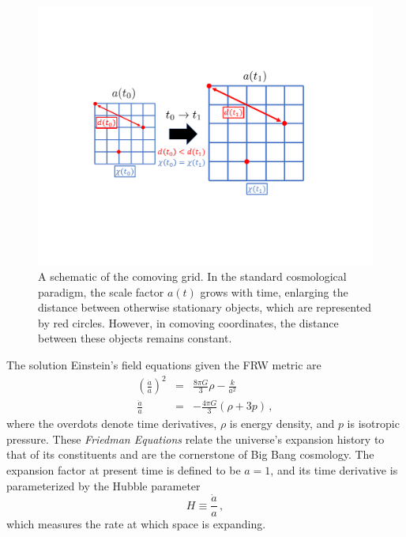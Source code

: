 \begin{figure}[!t]
    \centering
    \includegraphics[width=0.9\linewidth, trim=3cm 5.5cm 3cm 5cm, clip]{ScientificMotivation/Figures/comoving_grid.pdf}
    \caption[A schematic of the comoving grid]{A schematic of the comoving grid. In the standard cosmological paradigm, the scale factor $a(t)$ grows with time, enlarging the distance between otherwise stationary objects, which are represented by red circles. However, in comoving coordinates, the distance between these objects remains constant.}
    \label{fig:comoving_grid}
\end{figure}

The solution Einstein's field equations given the FRW metric are
\begin{eqnarray}
    \left( \frac{\dot a}{a} \right)^{2} & = & \frac{8 \pi G}{3} \rho - \frac{k}{a^{2}} \\
    \frac{\ddot a}{a} & = & - \frac{4 \pi G}{3} \left( \rho + 3p \right) \, ,
    \label{eq:friedmann_equations}
\end{eqnarray}
where the overdots denote time derivatives, $\rho$ is energy density, and $p$ is isotropic pressure. These \textit{Friedman Equations} relate the universe's expansion history to that of its constituents and are the cornerstone of Big Bang cosmology. The expansion factor at present time is defined to be $a = 1$, and its time derivative is parameterized by the Hubble parameter
\begin{equation}
    H \equiv \frac{\dot a}{a} \, ,
    \label{eq:hubble_constant}
\end{equation}
which measures the rate at which space is expanding.

